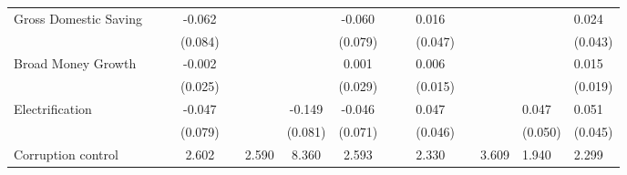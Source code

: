 \begin{table}[H]
\begin{adjustbox}{max width=\textwidth}
\begin{tabular}{l*{7}{c}}
\addlinespace
Gross Domestic Saving&                     &                     &      -0.062         &                     &                     &                     &      -0.060         &                     &                     &       0.016         &                     &                     &                     &       0.024         \\
            &                     &                     &     (0.084)         &                     &                     &                     &     (0.079)         &                     &                     &     (0.047)         &                     &                     &                     &     (0.043)         \\
\addlinespace
Broad Money Growth&                     &                     &      -0.002         &                     &                     &                     &       0.001         &                     &                     &       0.006         &                     &                     &                     &       0.015         \\
            &                     &                     &     (0.025)         &                     &                     &                     &     (0.029)         &                     &                     &     (0.015)         &                     &                     &                     &     (0.019)         \\
\addlinespace
Electrification&                     &                     &      -0.047         &                     &                     &      -0.149\sym{*}  &      -0.046         &                     &                     &       0.047         &                     &                     &       0.047         &       0.051         \\
            &                     &                     &     (0.079)         &                     &                     &     (0.081)         &     (0.071)         &                     &                     &     (0.046)         &                     &                     &     (0.050)         &     (0.045)         \\
\addlinespace
Corruption control&                     &                     &       2.602         &                     &       2.590\sym{*}  &       8.360\sym{***}&       2.593         &                     &                     &       2.330         &                     &       3.609\sym{***}&       1.940         &       2.299         \\

\end{tabular}
\end{adjustbox}
\end{table}
